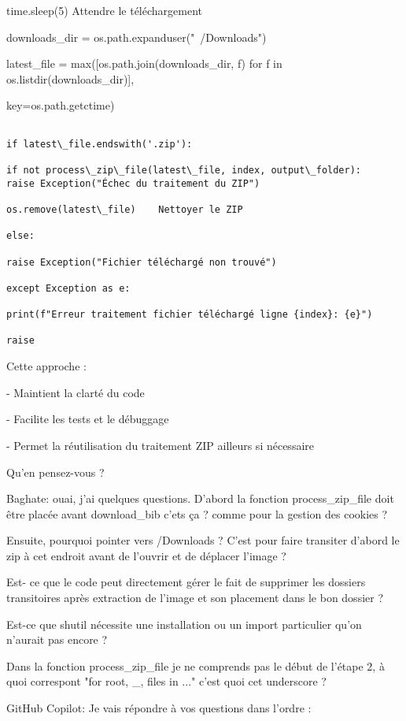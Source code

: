 time.sleep(5)    Attendre le téléchargement

downloads\_dir = os.path.expanduser("~/Downloads")

latest\_file = max([os.path.join(downloads\_dir, f) for f in os.listdir(downloads\_dir)],

key=os.path.getctime)

\begin{verbatim}

if latest\_file.endswith('.zip'):

if not process\_zip\_file(latest\_file, index, output\_folder):
raise Exception("Échec du traitement du ZIP")

os.remove(latest\_file)    Nettoyer le ZIP

else:

raise Exception("Fichier téléchargé non trouvé")

except Exception as e:

print(f"Erreur traitement fichier téléchargé ligne {index}: {e}")

raise

\end{verbatim}

Cette approche :

- Maintient la clarté du code

- Facilite les tests et le débuggage

- Permet la réutilisation du traitement ZIP ailleurs si nécessaire

Qu'en pensez-vous ?

Baghate: ouai, j'ai quelques questions. D'abord la fonction process\_zip\_file doit être placée avant download\_bib c'ets ça ? comme pour la gestion des cookies ?

Ensuite, pourquoi pointer vers /Downloads ? C'est pour faire transiter d'abord le zip à cet endroit avant de l'ouvrir et de déplacer l'image ?

Est- ce que le code peut directement gérer le fait de supprimer les dossiers transitoires après extraction de l'image et son placement dans le bon dossier ?

Est-ce que shutil nécessite une installation ou un import particulier qu'on n'aurait pas encore ?

Dans la fonction process\_zip\_file je ne comprends pas le début de l'étape 2, à quoi correspont "for root, \_, files in ..." c'est quoi cet underscore ?

GitHub Copilot: Je vais répondre à vos questions dans l'ordre :

